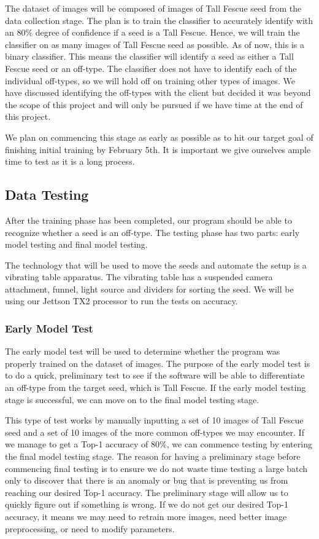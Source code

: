 \documentclass[onecolumn, draftclsnofoot,10pt, compsoc]{IEEEtran}
\begin{document}
The dataset of images will be composed of images of Tall Fescue seed from the data collection stage. The plan is to train the classifier to accurately identify with an 80\% degree of confidence if a seed is a Tall Fescue. Hence, we will train the classifier on as many images of Tall Fescue seed as possible. As of now, this is a binary classifier. This means the classifier will identify a seed as either a Tall Fescue seed or an off-type. The classifier does not have to identify each of the individual off-types, so we will hold off on training other types of images. We have discussed identifying the off-types with the client but decided it was beyond the scope of this project and will only be pursued if we have time at the end of this project.

We plan on commencing this stage as early as possible as to hit our target goal of finishing initial training by February 5th. It is important we give ourselves ample time to test as it is a long process. 

\subsection{Data Testing}
After the training phase has been completed, our program should be able to recognize whether a seed is an off-type. The testing phase has two parts: early model testing and final model testing. 


The technology that will be used to move the seeds and automate the setup is a vibrating table apparatus. The vibrating table has a suspended camera attachment, funnel, light source and dividers for sorting the seed. We will be using our Jettson TX2 processor to run the tests on accuracy. 

\subsubsection{Early Model Test}
The early model test will be used to determine whether the program was properly trained on the dataset of images. The purpose of the early model test is to do a quick, preliminary test to see if the software will be able to differentiate an off-type from the target seed, which is Tall Fescue. If the early model testing stage is successful, we can move on to the final model testing stage. 

This type of test works by manually inputting a set of 10 images of Tall Fescue seed and a set of 10 images of the more common off-types we may encounter. If we manage to get a Top-1 accuracy of 80\%, we can commence testing by entering the final model testing stage. The reason for having a preliminary stage before commencing final testing is to ensure we do not waste time testing a large batch only to discover that there is an anomaly or bug that is preventing us from reaching our desired Top-1 accuracy. The preliminary stage will allow us to quickly figure out if something is wrong. If we do not get our desired Top-1 accuracy, it means we may need to retrain more images, need better image preprocessing, or need to modify parameters.  
\end{document}
